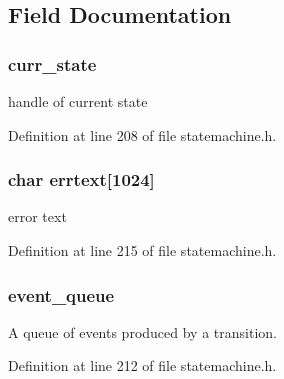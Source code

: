 \subsection{Field Documentation}
\hypertarget{struct__state__table_ac8a2e6d648912c3c020a4586cc8d1bc6}{
\subsubsection[{curr\-\_\-state}]{ curr\-\_\-state}}\label{struct__state__table_ac8a2e6d648912c3c020a4586cc8d1bc6}


handle of current state 



Definition at line 208 of file statemachine.\-h.

\hypertarget{struct__state__table_ae42183c10523c27cabfff280768cad3d}{
\subsubsection[{errtext}]{\setlength{\rightskip}{0pt plus 5cm}char errtext\mbox{[}1024\mbox{]}}}\label{struct__state__table_ae42183c10523c27cabfff280768cad3d}


error text 



Definition at line 215 of file statemachine.\-h.

\hypertarget{struct__state__table_aadba63f32267a050d2519727a7af1118}{
\subsubsection[{event\-\_\-queue}]{ event\-\_\-queue}}\label{struct__state__table_aadba63f32267a050d2519727a7af1118}


A queue of events produced by a transition. 



Definition at line 212 of file statemachine.\-h.

